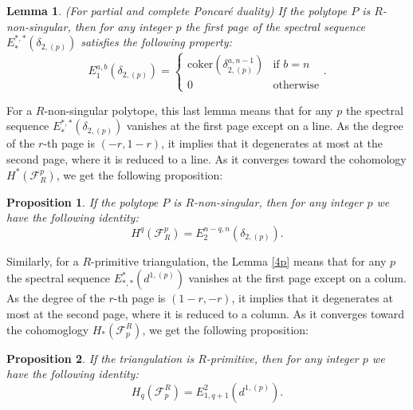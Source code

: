 \documentclass{article}
\newtheorem{lemma}{Lemma}
\newtheorem{proposition}{Proposition}
\begin{document}
\begin{lemma}
    (For partial and complete Poncaré duality) If the polytope $P$ is $R$-non-singular, then for any integer $p$ the first page of the spectral sequence $E^{*,*}_*(\delta_{2,(p)})$ satisfies the following property:
    \begin{equation*}
        E_1^{a,b}(\delta_{2,(p)}) = \left \{ \begin{array}{ll}
            \mathrm{coker}(\delta_{2,(p)}^{a,n-1}) & \text{if } b=n \\
            0 & \text{otherwise}
        \end{array} \right. .
    \end{equation*}
    \label{5}
\end{lemma}

For a $R$-non-singular polytope, this last lemma means that for any $p$ the spectral sequence $E_*^{*,*}(\delta_{2,(p)})$ vanishes at the first page except on a line. As the degree of the $r$-th page is $(-r,1-r)$, it implies that it degenerates at most at the second page, where it is reduced to a line. As it converges toward the cohomology $H^*(\mathcal{F}^p_R)$, we get the following proposition:

\begin{proposition}
    If the polytope $P$ is $R$-non-singular, then for any integer $p$ we have the following identity:
    \begin{equation*}
        H^{q}(\mathcal{F}^{p}_R) = E_2^{n-q,n}(\delta_{2,(p)}) .
    \end{equation*}
    \label{10a}
\end{proposition}

Similarly, for a $R$-primitive triangulation, the Lemma \ref{4p} means that for any $p$ the spectral sequence $E_{*,*}^*(d^{1,(p)})$ vanishes at the first page except on a colum. As the degree of the $r$-th page is $(1-r,-r)$, it implies that it degenerates at most at the second page, where it is reduced to a column. As it converges toward the cohomoglogy $H_*(\mathcal{F}_p^R)$, we get the following proposition:

\begin{proposition}
    If the triangulation is $R$-primitive, then for any integer $p$ we have the following identity:
    \begin{equation*}
        H_{q}(\mathcal{F}_{p}^R) = E^2_{1,q+1}(d^{1,(p)}) .
    \end{equation*}
    \label{10}
\end{proposition}
\end{document}
